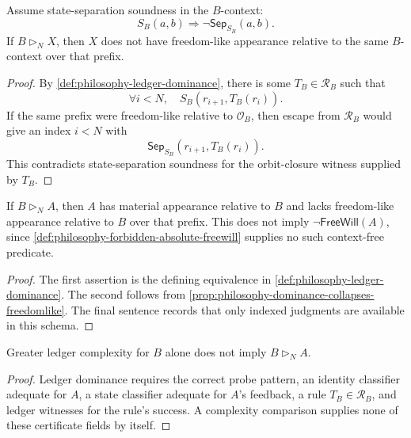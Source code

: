 \begin{proposition}
\label{prop:philosophy-dominance-collapses-freedomlike}
Assume state-separation soundness in the $B$-context:
$$
S_B(a,b)\Rightarrow\neg\mathsf{Sep}_{S_B}(a,b).
$$
If $B\triangleright_N X$, then $X$ does not have freedom-like
appearance relative to the same $B$-context over that prefix.
\end{proposition}
\begin{proof}
By \autoref{def:philosophy-ledger-dominance}, there is some
$T_B\in\mathcal R_B$ such that
$$
\forall i<N,\quad S_B(r_{i+1},T_B(r_i)).
$$
If the same prefix were freedom-like relative to $\mathcal O_B$, then
escape from $\mathcal R_B$ would give an index $i<N$ with
$$
\mathsf{Sep}_{S_B}(r_{i+1},T_B(r_i)).
$$
This contradicts state-separation soundness for the orbit-closure
witness supplied by $T_B$.
\end{proof}

\begin{corollary}
\label{cor:philosophy-layer-indexed-materialization}
If $B\triangleright_N A$, then $A$ has material appearance relative to
$B$ and lacks freedom-like appearance relative to $B$ over that prefix.
This does not imply $\neg\mathsf{FreeWill}(A)$, since
\autoref{def:philosophy-forbidden-absolute-freewill} supplies no such
context-free predicate.
\end{corollary}
\begin{proof}
The first assertion is the defining equivalence in
\autoref{def:philosophy-ledger-dominance}. The second follows from
\autoref{prop:philosophy-dominance-collapses-freedomlike}. The final
sentence records that only indexed judgments are available in this
schema.
\end{proof}

\begin{proposition}
\label{prop:philosophy-complexity-not-dominance}
Greater ledger complexity for $B$ alone does not imply
$B\triangleright_N A$.
\end{proposition}
\begin{proof}
Ledger dominance requires the correct probe pattern, an identity
classifier adequate for $A$, a state classifier adequate for $A$'s
feedback, a rule $T_B\in\mathcal R_B$, and ledger witnesses for the
rule's success. A complexity comparison supplies none of these
certificate fields by itself.
\end{proof}

